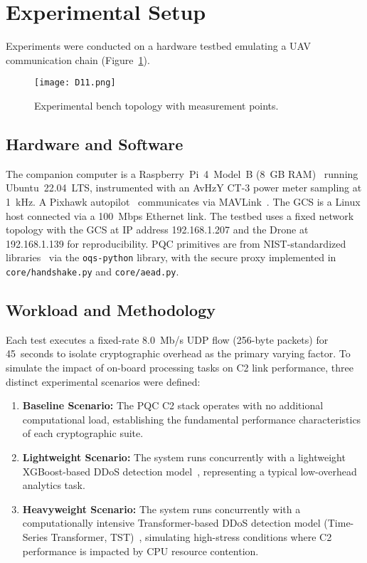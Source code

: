 \documentclass[sigconf,natbib=false]{acmart}
\begin{document}
\section{Experimental Setup}
\label{sec:experimental_setup}

Experiments were conducted on a hardware testbed emulating a UAV communication chain (Figure~\ref{fig:bench_topology}).

\begin{figure}[h]
  \centering
  \texttt{[image: D11.png]}
  \caption{Experimental bench topology with measurement points.}
  \label{fig:bench_topology}
\end{figure}

\subsection{Hardware and Software}

The companion computer is a Raspberry~Pi~4~Model~B (8~GB RAM)~\cite{raspi4_specs} running Ubuntu~22.04~LTS, instrumented with an AvHzY CT-3 power meter sampling at 1~kHz. A Pixhawk autopilot~\cite{meier2011pixhawk} communicates via MAVLink~\cite{mavlink_signing_mavlinkio}. The GCS is a Linux host connected via a 100~Mbps Ethernet link. The testbed uses a fixed network topology with the GCS at IP address 192.168.1.207 and the Drone at 192.168.1.139 for reproducibility. PQC primitives are from NIST-standardized libraries~\cite{nist_fips_203_2024,nist_fips_204_2024,nist_fips_205_2024} via the \texttt{oqs-python} library, with the secure proxy implemented in \texttt{core/handshake.py} and \texttt{core/aead.py}.

\subsection{Workload and Methodology}

Each test executes a fixed-rate 8.0~Mb/s UDP flow (256-byte packets) for 45~seconds to isolate cryptographic overhead as the primary varying factor. To simulate the impact of on-board processing tasks on C2 link performance, three distinct experimental scenarios were defined:

\begin{enumerate}
    \item \textbf{Baseline Scenario:} The PQC C2 stack operates with no additional computational load, establishing the fundamental performance characteristics of each cryptographic suite.
    \item \textbf{Lightweight Scenario:} The system runs concurrently with a lightweight XGBoost-based DDoS detection model~\cite{xgboost_2016}, representing a typical low-overhead analytics task.
  \item \textbf{Heavyweight Scenario:} The system runs concurrently with a computationally intensive Transformer-based DDoS detection model (Time-Series Transformer, TST)~\cite{futureinternet_transformer_iiot_2025}, simulating high-stress conditions where C2 performance is impacted by CPU resource contention.
\end{enumerate}
\end{document}
